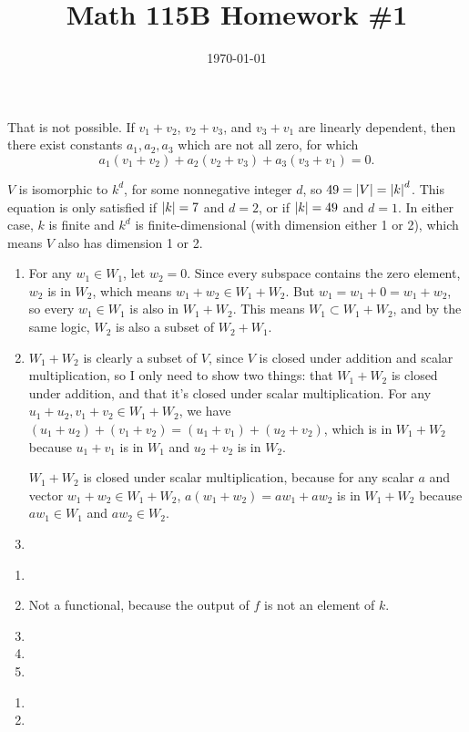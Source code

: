 \documentclass{article}
\date{\today}
\title{Math 115B Homework \#1}
\begin{document}
\maketitle

\begin{prob}
\end{prob}

\bigskip
\begin{prob}
\end{prob}
That is not possible. If $v_1+v_2$, $v_2+v_3$, and $v_3+v_1$ are linearly dependent, then there exist constants $a_1, a_2, a_3$ which are not all zero, for which
\[ a_1(v_1+v_2)+a_2(v_2+v_3)+a_3(v_3+v_1)=0. \]


\bigskip
\begin{prob}
\end{prob}
$V$ is isomorphic to $k^d$, for some nonnegative integer $d$, so $49=\left\lvert V \right\rvert=\left\lvert k \right\rvert^d$. This equation is only satisfied if $\left\lvert k \right\rvert=7$ and $d=2$, or if $\left\lvert k \right\rvert=49$ and $d=1$. In either case, $k$ is finite and $k^d$ is finite-dimensional (with dimension either 1 or 2), which means $V$ also has dimension 1 or 2.

\bigskip
\begin{prob}
\end{prob}
\begin{enumerate}[label=(\alph*)]
    \item For any $w_1 \in W_1$, let $w_2=0$. Since every subspace contains the zero element, $w_2$ is in $W_2$, which means $w_1 + w_2 \in W_1 + W_2$. But $w_1 = w_1+0=w_1+w_2$, so every $w_1 \in W_1$ is also in $W_1+W_2$. This means $W_1 \subset W_1+W_2$, and by the same logic, $W_2$ is also a subset of $W_2+W_1$.
    \item $W_1+W_2$ is clearly a subset of $V$, since $V$ is closed under addition and scalar multiplication, so I only need to show two things: that $W_1+W_2$ is closed under addition, and that it's closed under scalar multiplication. For any $u_1+u_2, v_1+v_2 \in W_1+W_2$, we have $(u_1+u_2)+(v_1+v_2) = (u_1+v_1)+(u_2+v_2)$, which is in $W_1+W_2$ because $u_1+v_1$ is in $W_1$ and $u_2+v_2$ is in $W_2$.
        \par
        $W_1+W_2$ is closed under scalar multiplication, because for any scalar $a$ and vector $w_1+w_2 \in W_1+W_2$, $a(w_1+w_2)=aw_1+aw_2$ is in $W_1+W_2$ because $aw_1 \in W_1$ and $aw_2 \in W_2$.
    \item
\end{enumerate}


\bigskip
\begin{prob}
\end{prob}
\begin{enumerate}[label=(\alph*)]
    \item
    \item Not a functional, because the output of $f$ is not an element of $k$.
    \item
    \item
    \item
\end{enumerate}


\bigskip
\begin{prob}
\end{prob}
\begin{enumerate}[label=(\alph*)]
    \item
    \item
\end{enumerate}



\end{document}
